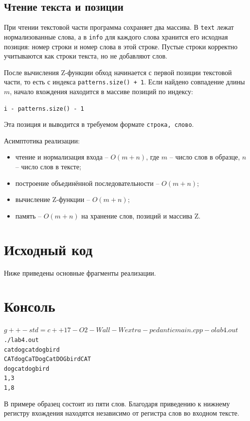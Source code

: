 \subsection{Чтение текста и позиции}

При чтении текстовой части программа сохраняет два массива. В \texttt{text} лежат нормализованные слова,
а в \texttt{info} для каждого слова хранится его исходная позиция: номер строки и номер слова в этой
строке. Пустые строки корректно учитываются как строки текста, но не добавляют слов.

После вычисления Z-функции обход начинается с первой позиции текстовой части, то есть с индекса
\texttt{patterns.size() + 1}. Если найдено совпадение длины \(m\), начало вхождения находится в массиве
позиций по индексу:
\begin{center}
\texttt{i - patterns.size() - 1}
\end{center}
Эта позиция и выводится в требуемом формате \texttt{строка, слово}.

Асимптотика реализации:
\begin{itemize}
\item чтение и нормализация входа -- \(O(m + n)\), где \(m\) -- число слов в образце, \(n\) -- число слов в тексте;
\item построение объединённой последовательности -- \(O(m + n)\);
\item вычисление Z-функции -- \(O(m + n)\);
\item память -- \(O(m + n)\) на хранение слов, позиций и массива Z.
\end{itemize}

\section{Исходный код}

Ниже приведены основные фрагменты реализации.








\pagebreak

\section{Консоль}
\begin{alltt}
$ g++ -std=c++17 -O2 -Wall -Wextra -pedantic main.cpp -o lab4.out
$ ./lab4.out
cat dog cat dog bird
CAT dog CaT Dog Cat DOG bird CAT
dog cat dog bird
1, 3
1, 8
\end{alltt}

В примере образец состоит из пяти слов. Благодаря приведению к нижнему регистру вхождения находятся
независимо от регистра слов во входном тексте.
\pagebreak
